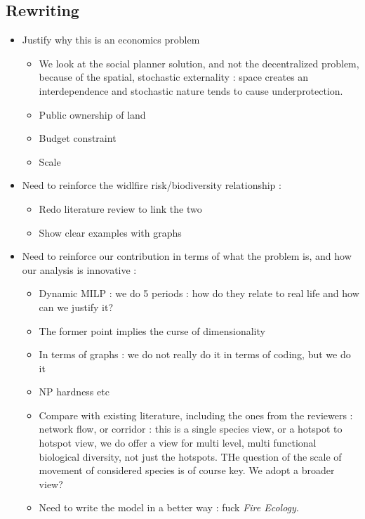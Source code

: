 \subsection*{Rewriting}
\begin{itemize}
\item Justify why this is an economics problem
\begin{itemize}
\item We look at the social planner solution, and not the decentralized problem, because of the spatial, stochastic externality : space creates an interdependence and stochastic nature tends to cause underprotection.
\item Public ownership of land
\item Budget constraint
\item Scale 
\end{itemize}
\item Need to reinforce the widlfire risk/biodiversity relationship : 
\begin{itemize}
\item Redo literature review to link the two
\item Show clear examples with graphs
\end{itemize}
\item Need to reinforce our contribution in terms of what the problem is, and how our analysis is innovative : 
\begin{itemize}
\item Dynamic MILP : we do 5 periods : how do they relate to real life and how can we justify it? 
\item The former point implies the curse of dimensionality
\item In terms of graphs : we do not really do it in terms of coding, but we do it
\item NP hardness etc
\item Compare with existing literature, including the ones from the reviewers : network flow, or corridor : this is a single species view, or a hotspot to hotspot view, we do offer a view for multi level, multi functional biological diversity, not just the hotspots. THe question of the scale of movement of considered species is of course key. We adopt a broader view?
\item Need to write the model in a better way : fuck \textit{Fire Ecology}. 
\end{itemize}

\end{itemize}

